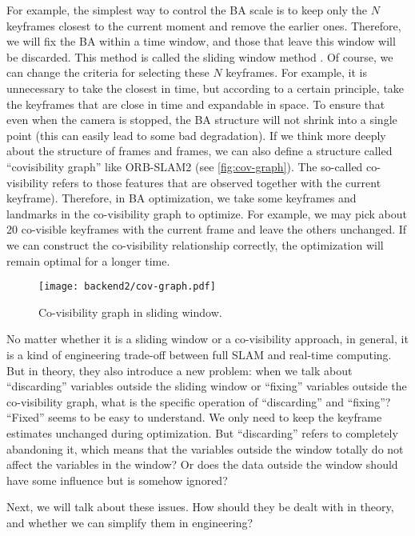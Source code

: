 For example, the simplest way to control the BA scale is to keep only the $N$ keyframes closest to the current moment and remove the earlier ones. Therefore, we will fix the BA within a time window, and those that leave this window will be discarded. This method is called the sliding window method \cite{Sibley2008}. Of course, we can change the criteria for selecting these $N$ keyframes. For example, it is unnecessary to take the closest in time, but according to a certain principle, take the keyframes that are close in time and expandable in space. To ensure that even when the camera is stopped, the BA structure will not shrink into a single point (this can easily lead to some bad degradation). If we think more deeply about the structure of frames and frames, we can also define a structure called ``covisibility graph'' like ORB-SLAM2 \cite{Mur-Artal2015} (see \autoref{fig:cov-graph}). The so-called co-visibility refers to those features that are observed together with the current keyframe). Therefore, in BA optimization, we take some keyframes and landmarks in the co-visibility graph to optimize. For example, we may pick about 20 co-visible keyframes with the current frame and leave the others unchanged. If we can construct the co-visibility relationship correctly, the optimization will remain optimal for a longer time.

\begin{figure}[!ht]
	\centering
	\texttt{[image: backend2/cov-graph.pdf]}
	\caption{Co-visibility graph in sliding window. }
	\label{fig:cov-graph}
\end{figure}

No matter whether it is a sliding window or a co-visibility approach, in general, it is a kind of engineering trade-off between full SLAM and real-time computing. But in theory, they also introduce a new problem: when we talk about ``discarding'' variables outside the sliding window or ``fixing'' variables outside the co-visibility graph, what is the specific operation of ``discarding'' and ``fixing''? ``Fixed'' seems to be easy to understand. We only need to keep the keyframe estimates unchanged during optimization. But ``discarding'' refers to completely abandoning it, which means that the variables outside the window totally do not affect the variables in the window?  Or does the data outside the window should have some influence but is somehow ignored?

Next, we will talk about these issues. How should they be dealt with in theory, and whether we can simplify them in engineering?

